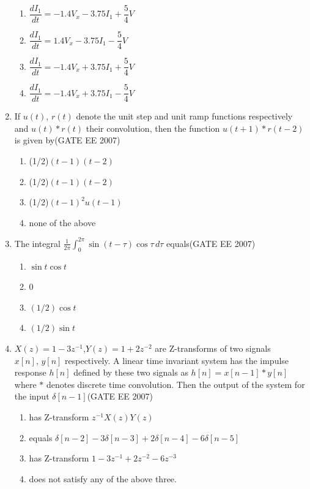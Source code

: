 \documentclass[a4paper,10pt]{exam}
\theoremstyle{remark}
\begin{document}
\begin{enumerate}
\begin{enumerate}
   \item   $\dfrac{dI_1}{dt} = -1.4 V_x - 3.75 I_1 + \dfrac{5}{4} V$ 
\item  $\dfrac{dI_1}{dt} = 1.4 V_x - 3.75 I_1 - \dfrac{5}{4} V$
\item $\dfrac{dI_1}{dt} = -1.4 V_x + 3.75 I_1 + \dfrac{5}{4} V$
\item $\dfrac{dI_1}{dt} = -1.4 V_x + 3.75 I_1 - \dfrac{5}{4} V$

\end{enumerate}


\item \quad If $u(t)$, $r(t)$ denote the unit step and unit ramp functions respectively and $u(t)*r(t)$ their convolution, then the function $u(t+1)*r(t-2)$ is given by\hfill{(GATE EE 2007)} 

\begin{multicols}{4}
\begin{enumerate} 
\item (1/2)$(t-1)(t-2)$
\item (1/2)$(t-1)(t-2)$
\item (1/2)$(t-1)^2u(t-1)$
\item none of the above
\end{enumerate}
\end{multicols}

\item The integral
$
\frac{1}{2\pi}\int_0^{2\pi}\sin(t-\tau)\cos\tau\, d\tau
$
equals\hfill{(GATE EE 2007)} 

\begin{multicols}{4}
\begin{enumerate}
    \item $\sin t \cos t$
\item  $0$
\item  $(1/2) \cos t$
\item  $(1/2) \sin t$
\end{enumerate}
\end{multicols}

\vfill
{}
\newpage


\item  \quad $X(z) = 1 - 3z^{-1}$,\quad $Y(z) = 1 + 2z^{-2}$ are Z-transforms of two signals $x[n],\,y[n]$ respectively.
A linear time invariant system has the impulse response $h[n]$ defined by these two signals as
$
    h[n] = x[n-1] * y[n]
$
where $*$ denotes discrete time convolution. Then the output of the system for the input $\delta[n-1]$\hfill{(GATE EE 2007)} 
\begin{enumerate}
    \item has Z-transform $z^{-1} X(z) Y(z)$
    \item equals $\delta[n-2] - 3\delta[n-3] + 2\delta[n-4] - 6\delta[n-5]$
    \item has Z-transform $1 - 3z^{-1} + 2z^{-2} - 6z^{-3}$
    \item does not satisfy any of the above three.
\end{enumerate}



\end{enumerate}
\end{document}
